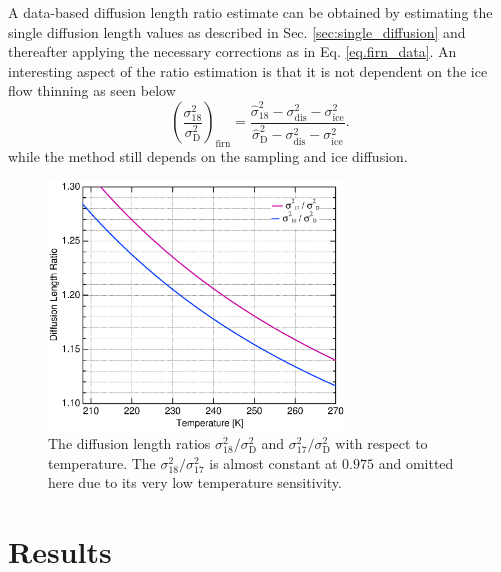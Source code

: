 \documentclass[11pt, draftcls, onecolumn]{IEEEtran} %
\numberwithin{equation}{section}
\numberwithin{table}{section}
\numberwithin{figure}{section}
\begin{document}
A data-based diffusion length ratio estimate can be obtained by estimating the single 
diffusion length values as described in Sec. \ref{sec:single_diffusion}
and thereafter applying the necessary corrections as in Eq. \ref{eq.firn_data}. 
An interesting aspect of the ratio estimation is that it is not dependent on the
ice flow thinning as seen below
\begin{equation} 
\left( \frac{\sigma^2_{18}}{\sigma^2_\mathrm{D}} \right)_{\mathrm{firn}}  =
\frac{ \hat{\sigma}^2_{18} - \sigma^2_{\mathrm{dis}} - \sigma^2_{\mathrm{ice}} }{\hat{\sigma}^2_{\mathrm{D}} - 
	\sigma^2_{\mathrm{dis}} - \sigma^2_{\mathrm{ice}} }.
\end{equation}
while the method still depends on the sampling and ice diffusion.
\begin{figure}[]	
	\vspace*{2mm}	
	\begin{center}		
		\includegraphics[width=0.7\textwidth]{Figure_9}		
		\caption{The diffusion length ratios $\sigma^2_{18}/\sigma^2_{\mathrm{D}}$ and $\sigma^2_{17}/\sigma^2_{\mathrm{D}}$
			with respect to temperature.
			The $\sigma^2_{18}/\sigma^2_{17}$ is almost constant at $0.975$ and omitted here due to its very low temperature sensitivity.} 		
		\label{fig:diff_len_ratio}	
	\end{center}
\end{figure}



\section{Results}\label{sec:results}
\end{document}
